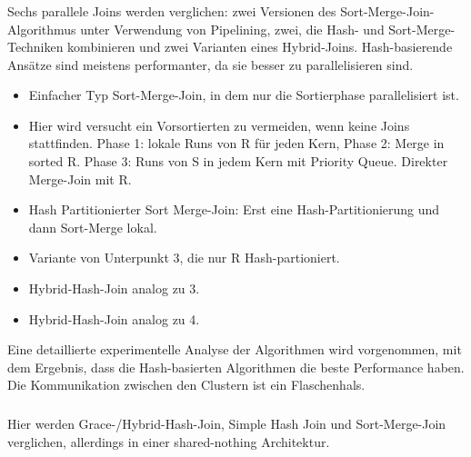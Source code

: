 \documentclass[a4paper,12pt,twoside]{article}
\begin{document}
\subsubsection*{}

Sechs parallele Joins werden verglichen: zwei Versionen des Sort-Merge-Join-Algorithmus unter Verwendung von Pipelining, zwei, die Hash- und Sort-Merge-Techniken kombinieren und zwei Varianten eines Hybrid-Joins. Hash-basierende Ansätze sind meistens performanter, da sie besser zu parallelisieren sind.

\begin{itemize}
	\item Einfacher Typ Sort-Merge-Join, in dem nur die Sortierphase parallelisiert ist.
	\item Hier wird versucht ein Vorsortierten zu vermeiden, wenn keine Joins stattfinden. Phase 1: lokale Runs von R für jeden Kern, Phase 2: Merge in sorted R. Phase 3: Runs von S in jedem Kern mit Priority Queue. Direkter Merge-Join mit R.
	\item Hash Partitionierter Sort Merge-Join: Erst eine Hash-Partitionierung und dann Sort-Merge lokal.
	\item Variante von Unterpunkt 3, die nur R Hash-partioniert.
	\item Hybrid-Hash-Join analog zu 3.
	\item Hybrid-Hash-Join analog zu 4.
\end{itemize}

Eine detaillierte experimentelle Analyse der Algorithmen wird vorgenommen, mit dem Ergebnis, dass die Hash-basierten Algorithmen die beste Performance haben. Die Kommunikation zwischen den Clustern ist ein Flaschenhals.

\subsubsection*{}

Hier werden Grace-/Hybrid-Hash-Join, Simple Hash Join und Sort-Merge-Join verglichen, allerdings in einer shared-nothing Architektur.
\end{document}
